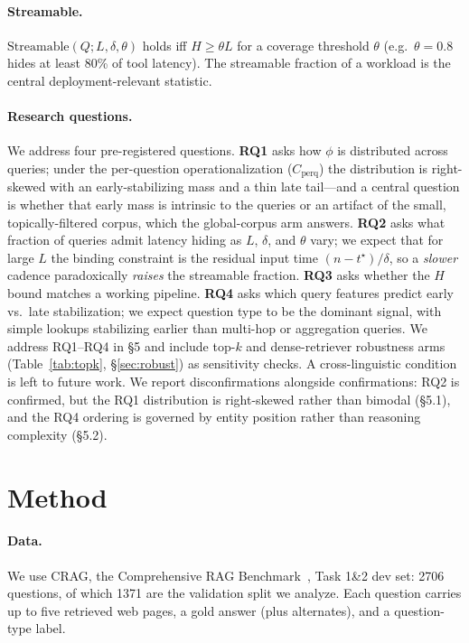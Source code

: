 \documentclass[11pt]{article}
\renewcommand{\cite}{\citep}                         %
\newcommand{\nTotal}{2706}
\newcommand{\nSplitZero}{1371}
\begin{document}
\paragraph{Streamable.} $\mathrm{Streamable}(Q; L, \delta, \theta)$ holds iff
$H \geq \theta L$ for a coverage threshold $\theta$ (e.g.\ $\theta=0.8$ hides at
least 80\% of tool latency). The streamable fraction of a workload is the central
deployment-relevant statistic.

\paragraph{Research questions.} We address four pre-registered questions.
\textbf{RQ1} asks how $\phi$ is distributed across queries; under the
per-question operationalization ($C_{\mathrm{perq}}$) the distribution is
right-skewed with an early-stabilizing mass and a thin late tail---and a central
question is whether that early mass is intrinsic to the queries or an artifact of
the small, topically-filtered corpus, which the global-corpus arm answers.
\textbf{RQ2} asks what fraction of queries admit latency hiding as $L$, $\delta$,
and $\theta$ vary; we expect that for large $L$ the binding constraint is the
residual input time $(n-t^\star)/\delta$, so a \emph{slower} cadence
paradoxically \emph{raises} the streamable fraction.
\textbf{RQ3} asks whether the $H$ bound matches a working pipeline.
\textbf{RQ4} asks which query features predict early vs.\ late stabilization; we
expect question type to be the dominant signal, with simple lookups stabilizing
earlier than multi-hop or aggregation queries.
We address RQ1--RQ4 in \S5 and include top-$k$ and dense-retriever robustness
arms (Table~\ref{tab:topk}, \S\ref{sec:robust}) as sensitivity checks. A
cross-linguistic condition is left to future work. We report
disconfirmations alongside confirmations: RQ2 is confirmed, but the RQ1
distribution is right-skewed rather than bimodal (\S5.1), and the RQ4 ordering
is governed by entity position rather than reasoning complexity (\S5.2).

\section{Method}\label{sec:method}
\paragraph{Data.} We use CRAG, the Comprehensive RAG
Benchmark~\cite{yang2024crag}, Task 1\&2 dev set: \nTotal{} questions, of which
\nSplitZero{} are the validation split we analyze. Each question carries up to
five retrieved web pages, a gold answer (plus alternates), and a question-type
label.
\end{document}
